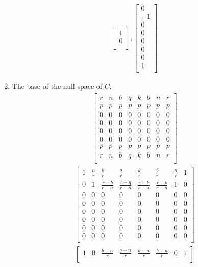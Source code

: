 \documentclass[a4paper,11pt]{article}
\begin{document}
\begin{enumerate}
\begin{align*}
\begin{bmatrix}
1 \\
0 \\
\end{bmatrix},
\begin{bmatrix}
0 \\
-1 \\
0 \\
0 \\
0 \\
0 \\
0 \\
1 \\
\end{bmatrix}
\end{align*}
\item The base of the null space of $C$:
\begin{align*}
\begin{bmatrix}
r & n & b & q & k & b & n & r \\
p & p & p & p & p & p & p & p \\
0 & 0 & 0 & 0 & 0 & 0 & 0 & 0 \\
0 & 0 & 0 & 0 & 0 & 0 & 0 & 0 \\
0 & 0 & 0 & 0 & 0 & 0 & 0 & 0 \\
0 & 0 & 0 & 0 & 0 & 0 & 0 & 0 \\
p & p & p & p & p & p & p & p \\
r & n & b & q & k & b & n & r \\
\end{bmatrix}
\end{align*}
\begin{align}
\begin{bmatrix}
1 & \frac{n}{r} & \frac{b}{r} & \frac{q}{r} & \frac{k}{r} & \frac{b}{r} & \frac{n}{r} & 1 \\
0 & 1 & \frac{r-b}{r-n} & \frac{r-q}{r-n} & \frac{r-k}{r-n} & \frac{r-b}{r-n} & 1 & 0 \\
0 & 0 & 0 & 0 & 0 & 0 & 0 & 0 \\
0 & 0 & 0 & 0 & 0 & 0 & 0 & 0 \\
0 & 0 & 0 & 0 & 0 & 0 & 0 & 0 \\
0 & 0 & 0 & 0 & 0 & 0 & 0 & 0 \\
0 & 0 & 0 & 0 & 0 & 0 & 0 & 0 \\
0 & 0 & 0 & 0 & 0 & 0 & 0 & 0 \\
\end{bmatrix}
\end{align}
\begin{align*}
\begin{bmatrix}
1 & 0 & \frac{b-n}{r} & \frac{q-n}{r} & \frac{k-n}{r} & \frac{b-n}{r} & 0 & 1 \\

\end{bmatrix}
\end{align*}
\end{enumerate}
\end{document}
